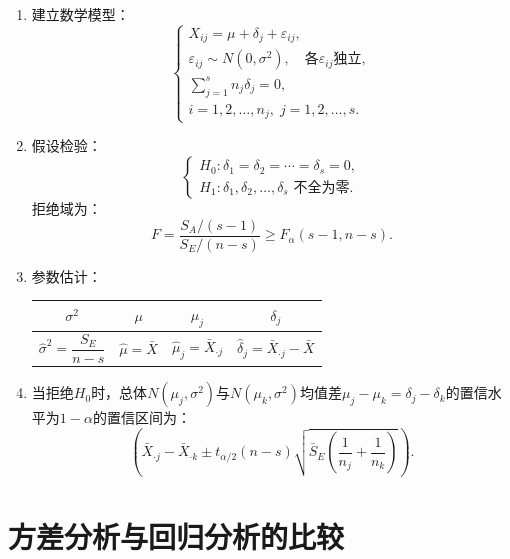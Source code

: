 \documentclass[11pt,a4paper]{report}
\theoremstyle{definition}
\begin{document}
\begin{enumerate}[label=\arabic*.,leftmargin=2em]
    \item 建立数学模型：
    \[
    \begin{cases}
    X_{ij}=\mu+\delta_{j}+\varepsilon_{ij},\\[0.3em]
    \varepsilon_{ij}\sim N(0,\sigma^{2}),\quad\text{各}\varepsilon_{ij}\text{独立},\\[0.3em]
    \displaystyle\sum_{j=1}^{s}n_{j}\delta_{j}=0,\\[0.5em]
    i=1,2,\ldots,n_{j},\;j=1,2,\ldots,s.
    \end{cases}
    \]
    
    \item 假设检验：
    \[
    \begin{cases}
    H_{0}\colon\delta_{1}=\delta_{2}=\cdots=\delta_{s}=0,\\[0.3em]
    H_{1}\colon\delta_{1},\delta_{2},\ldots,\delta_{s}\text{ 不全为零}.
    \end{cases}
    \]
    拒绝域为：
    \[
    F=\frac{S_{A}/(s-1)}{S_{E}/(n-s)}\geq F_{\alpha}(s-1,n-s).
    \]
    
    \item 参数估计：
    \begin{table}[htbp]
    \centering
    \begin{tabular}{@{}cccc@{}}
    \toprule
    $\sigma^{2}$ & $\mu$ & $\mu_{j}$ & $\delta_{j}$ \\
    \midrule
    $\hat{\sigma}^{2}=\dfrac{S_{E}}{n-s}$ & $\hat{\mu}=\bar{X}$ & $\hat{\mu}_{j}=\bar{X}_{\cdot j}$ & $\hat{\delta}_{j}=\bar{X}_{\cdot j}-\bar{X}$ \\
    \bottomrule
    \end{tabular}
    \end{table}
    
    \item 当拒绝$H_{0}$时，总体$N(\mu_{j},\sigma^{2})$与$N(\mu_{k},\sigma^{2})$均值差$\mu_{j}-\mu_{k}=\delta_{j}-\delta_{k}$的置信水平为$1-\alpha$的置信区间为：
    \[
    \left(\bar{X}_{\cdot j}-\bar{X}_{\cdot k}\pm t_{\alpha/2}(n-s)\sqrt{\bar{S}_{E}\left(\frac{1}{n_{j}}+\frac{1}{n_{k}}\right)}\right).
    \]
\end{enumerate}

\section*{方差分析与回归分析的比较}
\end{document}
